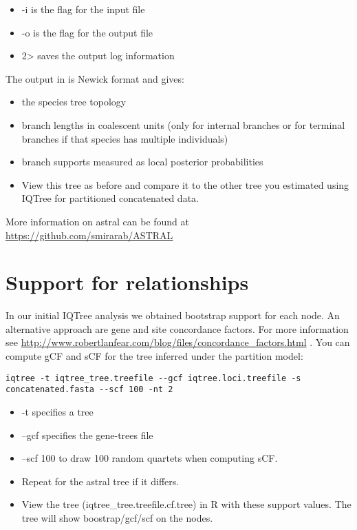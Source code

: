 \documentclass[
]{book}
\providecommand{\tightlist}{%
  \setlength{\itemsep}{0pt}\setlength{\parskip}{0pt}}
\begin{document}
\begin{itemize}
\tightlist
\item
  -i is the flag for the input file
\item
  -o is the flag for the output file
\item
  2\textgreater{} saves the output log information
\end{itemize}

The output in is Newick format and gives:

\begin{itemize}
\item
  the species tree topology
\item
  branch lengths in coalescent units (only for internal branches or for terminal branches if that species has multiple individuals)
\item
  branch supports measured as local posterior probabilities
\item
  View this tree as before and compare it to the other tree you estimated using IQTree for partitioned concatenated data.
\end{itemize}

More information on astral can be found at
\url{https://github.com/smirarab/ASTRAL}

\hypertarget{support-for-relationships}{%
\section{Support for relationships}\label{support-for-relationships}}

In our initial IQTree analysis we obtained bootstrap support for each node.
An alternative approach are gene and site concordance factors.
For more information see \url{http://www.robertlanfear.com/blog/files/concordance_factors.html} .
You can compute gCF and sCF for the tree inferred under the partition model:

\begin{verbatim}
iqtree -t iqtree_tree.treefile --gcf iqtree.loci.treefile -s concatenated.fasta --scf 100 -nt 2
\end{verbatim}

\begin{itemize}
\item
  -t specifies a tree
\item
  --gcf specifies the gene-trees file
\item
  --scf 100 to draw 100 random quartets when computing sCF.
\item
  Repeat for the astral tree if it differs.
\item
  View the tree (iqtree\_tree.treefile.cf.tree) in R with these support values. The tree will show boostrap/gcf/scf on the nodes.
\end{itemize}
\end{document}
